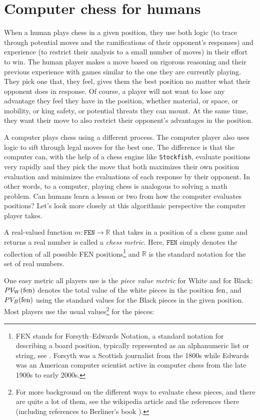 \documentclass[12pt]{book}
\newcommand{\FEN}{\texttt{FEN}}
\def\rrr{\mathbb{R}}
\begin{document}
\section{Computer chess for humans}

When a human plays chess in a given position, they use
both logic (to trace through potential moves and the
ramifications of their opponent's responses) and
experience (to restrict their analysis
to a small number of moves) in their effort to win.
The human player makes a move based on rigorous reasoning and their
previous experience with games similar to the one they are
currently playing.
They pick one that, they feel, gives them the best position no
matter what their opponent does in response. Of course,
a player will not want to lose any advantage they feel they
have in the position, whether material, or space, or mobility, or king
safety, or potential threats they can mount.
At the same time, they want their move to also
restrict their opponent's advantages in the position.

A computer plays chess using a different process.
The computer player also uses logic to sift through legal moves
for the best one. The difference is that the computer can, with the help of
a chess engine like {\tt Stockfish}, evaluate positions very rapidly
and they pick the move that both maximizes their own position
evaluation and minimizes the evaluations of each response by their opponent.
In other words, to a computer, playing chess is analogous to
solving a math problem. Can humans learn a lesson or two from how
the computer evaluates positions? Let's look more closely at this
algorithmic perspective the computer player takes.

A real-valued function $m:\FEN\to\rrr$
that takes in a position of a chess game and
returns a real number is called a {\it chess metric}.
Here, $\FEN$ simply denotes the collection of
all possible FEN positions\footnote{FEN stands for
Forsyth–Edwards Notation, a standard notation for describing a
board position, typically represented as an alphanumeric list or string,
see \cite{FEN}. Forsyth was a Scottish journalist from the
1800s while Edwards was an American computer scientist active in
computer chess from the late 1900s to early 2000s.}
and $\rrr$ is the standard notation for the set of real numbers.

One easy metric all players use is the {\it piece value metric}
for White and for Black: $PV_W({\rm fen})$ denotes the total value
of the white pieces in the position ${\rm fen}$,
and $PV_B({\rm fen})$  using the standard values for the Black pieces
in the given position.
Most players use the usual values\footnote{For more background
on the different ways to evaluate chess pieces, and there
are quite a lot of them, see 
the wikipedia article \cite{PV} and the references there
(including references to Berliner's book \cite{Be99}).} for the
pieces:
\end{document}
